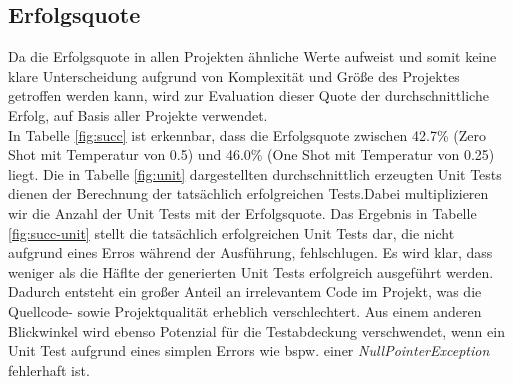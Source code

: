 \subsection{Erfolgsquote}
Da die Erfolgsquote in allen Projekten ähnliche Werte aufweist und somit keine klare Unterscheidung aufgrund von Komplexität und Größe des Projektes getroffen werden kann, wird zur Evaluation dieser Quote der durchschnittliche Erfolg, auf Basis aller Projekte verwendet.\\
In Tabelle \ref{fig:succ} ist erkennbar, dass die Erfolgsquote zwischen 42.7\% (Zero Shot mit Temperatur von 0.5) und 46.0\% (One Shot mit Temperatur von 0.25) liegt. Die in Tabelle \ref{fig:unit} dargestellten durchschnittlich erzeugten Unit Tests dienen der Berechnung der tatsächlich erfolgreichen Tests.Dabei multiplizieren wir die Anzahl der Unit Tests mit der Erfolgsquote. Das Ergebnis in Tabelle \ref{fig:succ-unit} stellt die tatsächlich erfolgreichen Unit Tests dar, die nicht aufgrund eines Erros während der Ausführung, fehlschlugen.  Es wird klar, dass weniger als die Häflte der generierten Unit Tests erfolgreich ausgeführt werden. Dadurch entsteht ein großer Anteil an irrelevantem Code im Projekt, was die Quellcode- sowie Projektqualität erheblich verschlechtert. Aus einem anderen Blickwinkel wird ebenso Potenzial für die Testabdeckung verschwendet, wenn ein Unit Test aufgrund eines simplen Errors wie bspw. einer \textit{NullPointerException} fehlerhaft ist.

